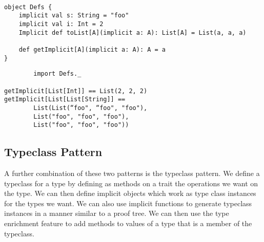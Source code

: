 \documentclass[12pt,a4paper,twoside,openright]{report}
\begin{document}
\begin{framed}
	\begin{framed}
		\begin{verbatim}
		
object Defs {
    implicit val s: String = "foo"
    implicit val i: Int = 2
    Implicit def toList[A](implicit a: A): List[A] = List(a, a, a)

    def getImplicit[A](implicit a: A): A = a
}
		\end{verbatim}
	\end{framed}
	\begin{framed}
		\begin{verbatim}
		import Defs._

getImplicit[List[Int]] == List(2, 2, 2)
getImplicit[List[List[String]] == 
        List(List(“foo", “foo", "foo"),
        List("foo", "foo", "foo"), 
        List("foo", "foo", "foo"))
		\end{verbatim}
	\end{framed}
\end{framed}


\subsection{Typeclass Pattern}
A further combination of these two patterns is the typeclass pattern. We define a typeclass for a type by defining as methods on a trait the operations we want on the type. We can then define implicit objects which work as type class instances for the types we want. We can also use implicit functions to generate typeclass instances in a manner similar to a proof tree. We can then use the type enrichment feature to add methods to values of a type that is a member of the typeclass.
\end{document}

